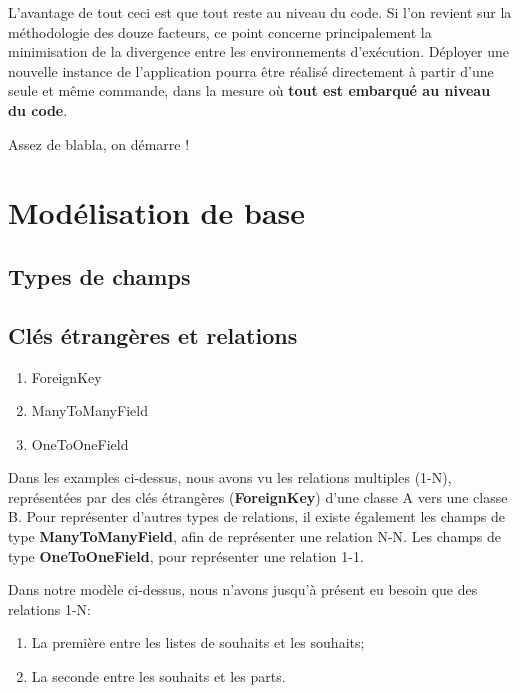\documentclass[11pt]{amsbook}
\begin{document}
L’avantage de tout ceci est que tout reste au niveau du code.
Si l’on revient sur la méthodologie des douze facteurs, ce point concerne principalement la minimisation de la divergence entre les environnements d’exécution.
Déployer une nouvelle instance de l’application pourra être réalisé directement à partir d’une seule et même commande, dans la mesure où \textbf{tout est embarqué au niveau du code}.


Assez de blabla, on démarre !


\hypertarget{x-modélisation-de-base}{\section{Modélisation de base}}
\hypertarget{x-types-de-champs}{\subsection{Types de champs}}

\hypertarget{x-clés-étrangères-et-relations}{\subsection{Clés étrangères et relations}}
\begin{enumerate}

\item{ForeignKey}

\item{ManyToManyField}

\item{OneToOneField}

\end{enumerate}


Dans les examples ci-dessus, nous avons vu les relations multiples (1-N), représentées par des clés étrangères (\textbf{ForeignKey}) d’une classe A vers une classe B.
Pour représenter d’autres types de relations, il existe également les champs de type \textbf{ManyToManyField}, afin de représenter une relation N-N. Les champs de type \textbf{OneToOneField}, pour représenter une relation 1-1.


Dans notre modèle ci-dessus, nous n’avons jusqu’à présent eu besoin que des relations 1-N:


\begin{enumerate}

\item{La première entre les listes de souhaits et les souhaits;}

\item{La seconde entre les souhaits et les parts.}

\end{enumerate}
\end{document}
